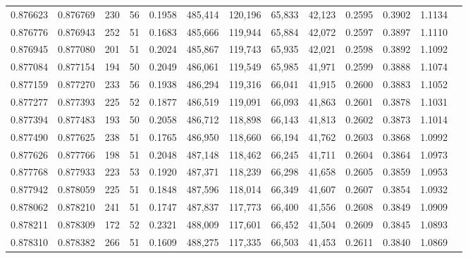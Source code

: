 \begin{tabular}{rrrrrrrrrrrrr}
0.876623 & 0.876769 &   230 &  56 &                                     0.1958 & 485,414 & 120,196 &  65,833 &  42,123 & 0.2595 & 0.3902 & 1.1134 \\
0.876776 & 0.876943 &   252 &  51 &                                     0.1683 & 485,666 & 119,944 &  65,884 &  42,072 & 0.2597 & 0.3897 & 1.1110 \\
0.876945 & 0.877080 &   201 &  51 &                                     0.2024 & 485,867 & 119,743 &  65,935 &  42,021 & 0.2598 & 0.3892 & 1.1092 \\
0.877084 & 0.877154 &   194 &  50 &                                     0.2049 & 486,061 & 119,549 &  65,985 &  41,971 & 0.2599 & 0.3888 & 1.1074 \\
0.877159 & 0.877270 &   233 &  56 &                                     0.1938 & 486,294 & 119,316 &  66,041 &  41,915 & 0.2600 & 0.3883 & 1.1052 \\
0.877277 & 0.877393 &   225 &  52 &                                     0.1877 & 486,519 & 119,091 &  66,093 &  41,863 & 0.2601 & 0.3878 & 1.1031 \\
0.877394 & 0.877483 &   193 &  50 &                                     0.2058 & 486,712 & 118,898 &  66,143 &  41,813 & 0.2602 & 0.3873 & 1.1014 \\
0.877490 & 0.877625 &   238 &  51 &                                     0.1765 & 486,950 & 118,660 &  66,194 &  41,762 & 0.2603 & 0.3868 & 1.0992 \\
0.877626 & 0.877766 &   198 &  51 &                                     0.2048 & 487,148 & 118,462 &  66,245 &  41,711 & 0.2604 & 0.3864 & 1.0973 \\
0.877768 & 0.877933 &   223 &  53 &                                     0.1920 & 487,371 & 118,239 &  66,298 &  41,658 & 0.2605 & 0.3859 & 1.0953 \\
0.877942 & 0.878059 &   225 &  51 &                                     0.1848 & 487,596 & 118,014 &  66,349 &  41,607 & 0.2607 & 0.3854 & 1.0932 \\
0.878062 & 0.878210 &   241 &  51 &                                     0.1747 & 487,837 & 117,773 &  66,400 &  41,556 & 0.2608 & 0.3849 & 1.0909 \\
0.878211 & 0.878309 &   172 &  52 &                                     0.2321 & 488,009 & 117,601 &  66,452 &  41,504 & 0.2609 & 0.3845 & 1.0893 \\
0.878310 & 0.878382 &   266 &  51 &                                     0.1609 & 488,275 & 117,335 &  66,503 &  41,453 & 0.2611 & 0.3840 & 1.0869 \\

\end{tabular}
